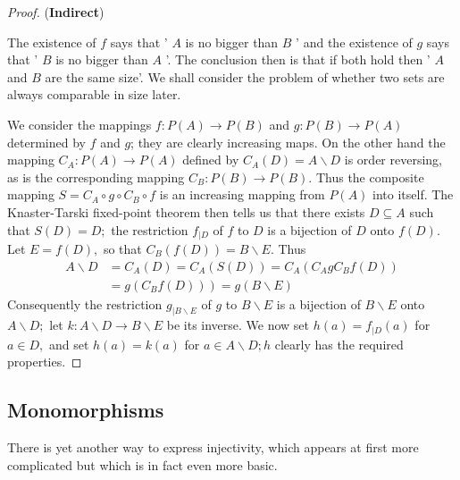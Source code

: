 \documentclass[12pt]{book}
\theoremstyle{definition}\newtheorem{dfn}{Définition}[chapter]
\theoremstyle{plain}\newtheorem{thm}{Théorème}[chapter]
\theoremstyle{plain}\newtheorem{prp}{Proposition}[chapter]
\theoremstyle{plain}\newtheorem{lem}{\bf Lemme}[chapter]
\theoremstyle{plain}\newtheorem{axm}{\bf Axiome}[chapter]
\theoremstyle{plain}\newtheorem{lmm}{\bf Lemme}[chapter]
\theoremstyle{plain}\newtheorem{exm}{\bf Example}[chapter]
\theoremstyle{plain}\newtheorem{cor}{\bf Corollaire}[chapter]
\theoremstyle{remark}\newtheorem{rem}{Remarque}[chapter]
\begin{document}
\begin{proof}
({\bf Indirect})

The existence of $f$ says that ' $A$ is no bigger than $B$ ' and the existence of $g$ says that ' $B$ is no bigger than $A$ '. The conclusion then is that if both hold then ' $A$ and $B$ are the same size'. We shall consider the problem of whether two sets are always comparable in size later.

We consider the mappings $f: P(A) \rightarrow P(B)$ and $g: P(B) \rightarrow P(A)$ determined by $f$ and $g$; they are clearly increasing maps. On the other hand the mapping $C_{A}: P(A) \rightarrow P(A)$ defined by $C_{A}(D)=A \backslash D$ is order reversing, as is the corresponding mapping $C_{B}: P(B) \rightarrow P(B)$. Thus the composite mapping $S=C_{A} \circ g \circ C_{B} \circ f$ is an increasing mapping from $P(A)$ into itself. The Knaster-Tarski fixed-point theorem then tells us that there exists $D \subseteq A$ such that $S(D)=D ;$ the restriction $f_{\mid D}$ of $f$ to $D$ is a bijection of $D$ onto $f(D) .$ Let $E=f(D),$ so that $C_{B}(f(D))=B \backslash E .$ Thus
$$
\begin{aligned}
A \backslash D &=C_{A}(D)=C_{A}(S(D))=C_{A}\left(C_{A} g C_{B} f(D)\right) \\
&\left.=g\left(C_{B} f(D)\right)\right)=g(B \backslash E)
\end{aligned}
$$
Consequently the restriction $g_{\mid B \backslash E}$ of $g$ to $B \backslash E$ is a bijection of $B \backslash E$ onto $A \backslash D ;$ let $k: A \backslash D \rightarrow B \backslash E$ be its inverse. We now set $h(a)=f_{\mid D}(a)$
for $a \in D,$ and set $h(a)=k(a)$ for $a \in A \backslash D ; h$ clearly has the required properties.

\end{proof}

\subsection{Monomorphisms}
There is yet another way to express injectivity, which appears at first more complicated but which is in fact even more basic.
\end{document}
